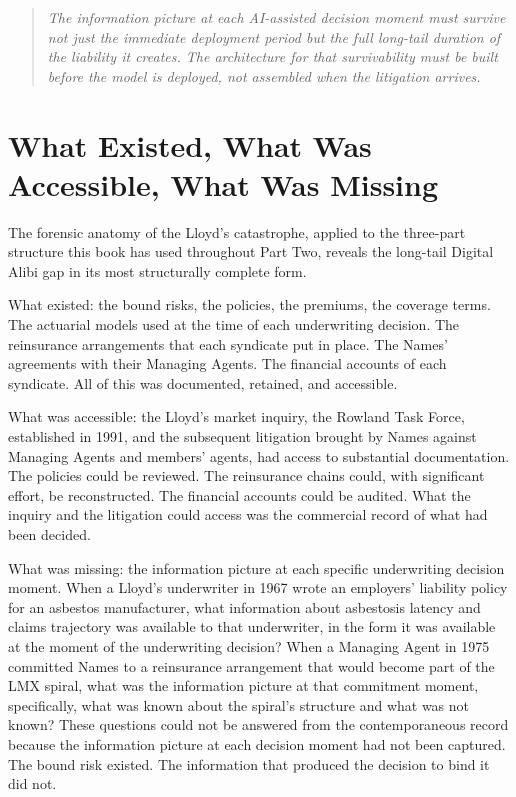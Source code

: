 \begin{quote}
\emph{The information picture at each AI-assisted decision moment must survive not just the immediate deployment period but the full long-tail duration of the liability it creates. The architecture for that survivability must be built before the model is deployed, not assembled when the litigation arrives.}
\end{quote}

\scenebreak

\section{What Existed, What Was Accessible, What Was Missing}

The forensic anatomy of the Lloyd's catastrophe, applied to the three-part structure this book has used throughout Part Two, reveals the long-tail Digital Alibi gap in its most structurally complete form.

What existed: the bound risks, the policies, the premiums, the coverage terms. The actuarial models used at the time of each underwriting decision. The reinsurance arrangements that each syndicate put in place. The Names' agreements with their Managing Agents. The financial accounts of each syndicate. All of this was documented, retained, and accessible.

What was accessible: the Lloyd's market inquiry, the Rowland Task Force, established in 1991, and the subsequent litigation brought by Names against Managing Agents and members' agents, had access to substantial documentation. The policies could be reviewed. The reinsurance chains could, with significant effort, be reconstructed. The financial accounts could be audited. What the inquiry and the litigation could access was the commercial record of what had been decided.

What was missing: the information picture at each specific underwriting decision moment. When a Lloyd's underwriter in 1967 wrote an employers' liability policy for an asbestos manufacturer, what information about asbestosis latency and claims trajectory was available to that underwriter, in the form it was available at the moment of the underwriting decision? When a Managing Agent in 1975 committed Names to a reinsurance arrangement that would become part of the LMX spiral, what was the information picture at that commitment moment, specifically, what was known about the spiral's structure and what was not known? These questions could not be answered from the contemporaneous record because the information picture at each decision moment had not been captured. The bound risk existed. The information that produced the decision to bind it did not.

